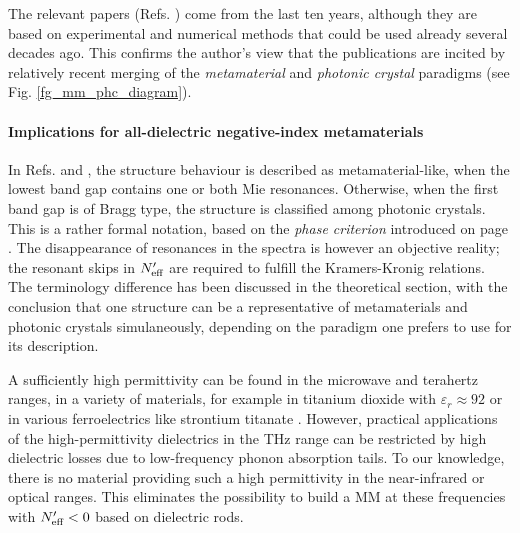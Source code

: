 The relevant papers (Refs. \cite{shi2007, peng2007, vynck2009all, rybin2014photonic, dominec2014transition}) come from the last ten years, although they are based on experimental and numerical methods that could be used already several decades ago. This confirms the author's view that the publications are incited by relatively recent merging of the \textit{metamaterial} and \textit{photonic crystal} paradigms (see Fig. \ref{fg_mm_phc_diagram}).

\paragraph{Implications for all-dielectric negative-index metamaterials} %
In Refs.  \cite{rybin2014photonic} and \cite{dominec2014transition}, the structure behaviour is described as metamaterial-like, when the lowest band gap contains one or both Mie resonances. Otherwise, when the first band gap is of Bragg type, the structure is classified among photonic crystals. 
This is a rather formal notation, based on the \textit{phase criterion} introduced on page \pageref{phasecriterion}. 
The disappearance of resonances in the spectra is however an objective reality; the resonant skips in $N_{\text{eff} }'$ are required to fulfill the Kramers-Kronig relations. 
The terminology difference has been discussed in the theoretical section, with the conclusion that one structure can be a representative of metamaterials and photonic crystals simulaneously, depending on the paradigm one prefers to use for its description. 


A sufficiently high permittivity can be found in the microwave and terahertz ranges, in a variety of materials, for example in titanium dioxide with $\varepsilon_r \approx 92$ \cite{nemec2009tunable} or in various ferroelectrics like strontium titanate \cite{skoromets2011tuning}. However, practical applications of the high-permittivity dielectrics in the THz range can be restricted by high dielectric losses due to low-frequency phonon absorption tails. To our knowledge, there is no material providing such a high permittivity in the near-infrared or optical ranges. This eliminates the possibility to build a MM at these frequencies with $N_{\text{eff} }'<0$ based on dielectric rods.

\FloatBarrier %

